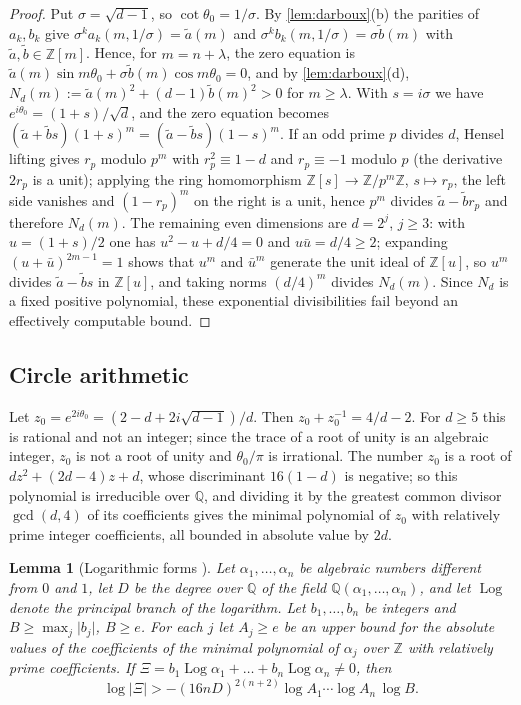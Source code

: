 \documentclass[11pt]{amsart}
\numberwithin{equation}{section}
\newtheorem{lemma}[theorem]{Lemma}
\theoremstyle{definition}
\theoremstyle{remark}
\newcommand{\Z}{\mathbb{Z}}
\newcommand{\Q}{\mathbb{Q}}
\newcommand{\abs}[1]{\lvert #1\rvert}
\newcommand{\Log}{\operatorname{Log}}
\begin{document}
\begin{proof}
Put $\sigma=\sqrt{d-1}$, so $\cot\theta_0=1/\sigma$. By \cref{lem:darboux}(b) the parities of $a_k,b_k$ give $\sigma^ka_k(m,1/\sigma)=\tilde a(m)$ and $\sigma^kb_k(m,1/\sigma)=\sigma\tilde b(m)$ with $\tilde a,\tilde b\in\Z[m]$. Hence, for $m=n+\lambda$, the zero equation is $\tilde a(m)\sin m\theta_0+\sigma\tilde b(m)\cos m\theta_0=0$, and by \cref{lem:darboux}(d), $N_d(m):=\tilde a(m)^2+(d-1)\tilde b(m)^2>0$ for $m\ge\lambda$. With $s=i\sigma$ we have $e^{i\theta_0}=(1+s)/\sqrt d$, and the zero equation becomes $(\tilde a+\tilde bs)(1+s)^m=(\tilde a-\tilde bs)(1-s)^m$. If an odd prime $p$ divides $d$, Hensel lifting gives $r_p$ modulo $p^m$ with $r_p^2\equiv1-d$ and $r_p\equiv-1$ modulo $p$ (the derivative $2r_p$ is a unit); applying the ring homomorphism $\Z[s]\to\Z/p^m\Z$, $s\mapsto r_p$, the left side vanishes and $(1-r_p)^m$ on the right is a unit, hence $p^m$ divides $\tilde a-\tilde br_p$ and therefore $N_d(m)$. The remaining even dimensions are $d=2^j$, $j\ge3$: with $u=(1+s)/2$ one has $u^2-u+d/4=0$ and $u\bar u=d/4\ge2$; expanding $(u+\bar u)^{2m-1}=1$ shows that $u^m$ and $\bar u^m$ generate the unit ideal of $\Z[u]$, so $u^m$ divides $\tilde a-\tilde bs$ in $\Z[u]$, and taking norms $(d/4)^m$ divides $N_d(m)$. Since $N_d$ is a fixed positive polynomial, these exponential divisibilities fail beyond an effectively computable bound.
\end{proof}

\subsection{Circle arithmetic}\label{sec:circlearith}
Let $z_0=e^{2i\theta_0}=(2-d+2i\sqrt{d-1})/d$. Then $z_0+z_0^{-1}=4/d-2$. For $d\ge5$ this is rational and not an integer; since the trace of a root of unity is an algebraic integer, $z_0$ is not a root of unity and $\theta_0/\pi$ is irrational. The number $z_0$ is a root of $dz^2+(2d-4)z+d$, whose discriminant $16(1-d)$ is negative; so this polynomial is irreducible over $\Q$, and dividing it by the greatest common divisor $\gcd(d,4)$ of its coefficients gives the minimal polynomial of $z_0$ with relatively prime integer coefficients, all bounded in absolute value by $2d$.

\begin{lemma}[Logarithmic forms {\cite[p.~20]{BW}}]\label{lem:BW}
Let $\alpha_1,\dots,\alpha_n$ be algebraic numbers different from $0$ and $1$, let $D$ be the degree over $\Q$ of the field $\Q(\alpha_1,\dots,\alpha_n)$, and let $\Log$ denote the principal branch of the logarithm. Let $b_1,\dots,b_n$ be integers and $B\ge\max_j\abs{b_j}$, $B\ge e$. For each $j$ let $A_j\ge e$ be an upper bound for the absolute values of the coefficients of the minimal polynomial of $\alpha_j$ over $\Z$ with relatively prime coefficients. If $\Xi=b_1\Log\alpha_1+\dots+b_n\Log\alpha_n\ne0$, then
\[
\log\abs\Xi>-(16nD)^{2(n+2)}\log A_1\cdots\log A_n\,\log B .
\]
\end{lemma}
\end{document}
